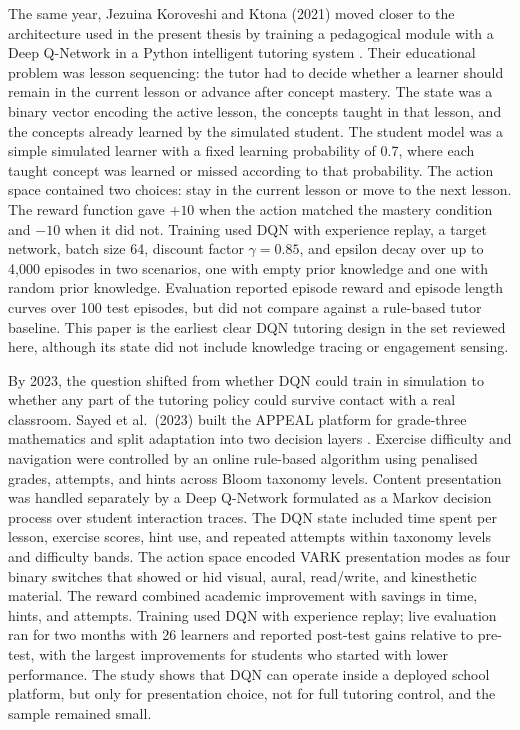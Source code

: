 The same year, Jezuina Koroveshi and Ktona (2021) moved closer to the architecture used in the present thesis by training a pedagogical module with a Deep Q-Network in a Python intelligent tutoring system \cite{jezuina_koroveshi_training_2021}. Their educational problem was lesson sequencing: the tutor had to decide whether a learner should remain in the current lesson or advance after concept mastery. The state was a binary vector encoding the active lesson, the concepts taught in that lesson, and the concepts already learned by the simulated student. The student model was a simple simulated learner with a fixed learning probability of 0.7, where each taught concept was learned or missed according to that probability. The action space contained two choices: stay in the current lesson or move to the next lesson. The reward function gave $+10$ when the action matched the mastery condition and $-10$ when it did not. Training used \ac{DQN} with experience replay, a target network, batch size 64, discount factor $\gamma=0.85$, and epsilon decay over up to 4{,}000 episodes in two scenarios, one with empty prior knowledge and one with random prior knowledge. Evaluation reported episode reward and episode length curves over 100 test episodes, but did not compare against a rule-based tutor baseline. This paper is the earliest clear \ac{DQN} tutoring design in the set reviewed here, although its state did not include knowledge tracing or engagement sensing.

By 2023, the question shifted from whether \ac{DQN} could train in simulation to whether any part of the tutoring policy could survive contact with a real classroom. Sayed et al.\ (2023) built the APPEAL platform for grade-three mathematics and split adaptation into two decision layers \cite{sayed_ai-based_2023}. Exercise difficulty and navigation were controlled by an online rule-based algorithm using penalised grades, attempts, and hints across Bloom taxonomy levels. Content presentation was handled separately by a Deep Q-Network formulated as a Markov decision process over student interaction traces. The \ac{DQN} state included time spent per lesson, exercise scores, hint use, and repeated attempts within taxonomy levels and difficulty bands. The action space encoded VARK presentation modes as four binary switches that showed or hid visual, aural, read/write, and kinesthetic material. The reward combined academic improvement with savings in time, hints, and attempts. Training used \ac{DQN} with experience replay; live evaluation ran for two months with 26 learners and reported post-test gains relative to pre-test, with the largest improvements for students who started with lower performance. The study shows that \ac{DQN} can operate inside a deployed school platform, but only for presentation choice, not for full tutoring control, and the sample remained small.

